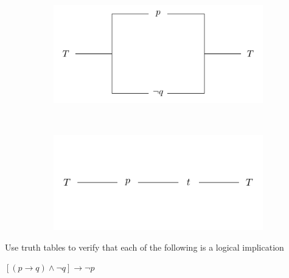 \documentclass[a4paper, english, 12pt]{article} %
\begin{document}
\begin{answer}
  \begin{figure}[hbp!]
    \centering
    \begin{subfigure}[b]{0.45\textwidth}
      \includegraphics[width=\textwidth]{MA0301-oving-02-truth-diagram-1-solution}
      \caption{}
      \label{fig:solution-1}
    \end{subfigure}
    ~ %
    \begin{subfigure}[b]{0.5\textwidth}
      \includegraphics[width=\textwidth]{MA0301-oving-02-truth-diagram-2-solution}
      \caption{}
      \label{fig:solution-2}
    \end{subfigure}
    \caption{}\label{fig:truth-diagrams-solutions}
  \end{figure}
\end{answer}



\begin{problem}[2]
  Use truth tables to verify that each of the following is a logical implication
\end{problem}

\begin{subproblem}[2]
  $[(p \to q) \wedge \neg q] \to \neg p$
\end{subproblem}
  
\end{document}
